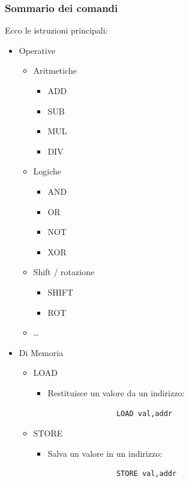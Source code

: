 \documentclass[12pt,a4paper]{article}
\begin{document}
\subsubsection{Sommario dei comandi}
Ecco le istruzioni principali:
\begin{itemize}
    \item Operative
    \begin{itemize}
        \item Aritmetiche
        \begin{itemize}
            \item ADD
            \item SUB
            \item MUL
            \item DIV
        \end{itemize}
        \item Logiche
        \begin{itemize}
            \item AND
            \item OR
            \item NOT
            \item XOR
        \end{itemize}
        \item Shift / rotazione
        \begin{itemize}
            \item SHIFT
            \item ROT
        \end{itemize}
        \item \dots
    \end{itemize}
    \item Di Memoria
    \begin{itemize}
        \item LOAD
        \begin{itemize}
            \item Restituisce un valore da un indirizzo:
            \begin{lstlisting}
                LOAD val,addr
            \end{lstlisting}
        \end{itemize}
        \item STORE
        \begin{itemize}
            \item Salva un valore in un indirizzo:
            \begin{lstlisting}
                STORE val,addr

\end{lstlisting}
\end{itemize}
\end{itemize}
\end{itemize}
\end{document}
